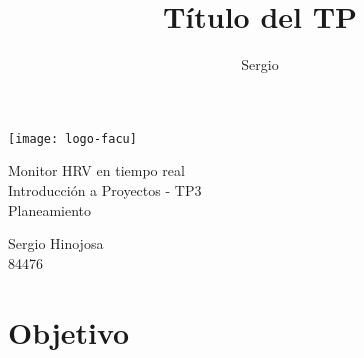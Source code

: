 \documentclass[12pt]{article}
\title{Título del TP}
\author{Sergio}
\numberwithin{equation}{section}
\numberwithin{figure}{section}
\numberwithin{table}{section}
\begin{document}



\begin{titlepage}

\thispagestyle{empty}

\begin{center}
    \texttt{[image: logo-facu]}
\end{center}

\vfill

\begin{center}
	\Huge{Monitor HRV en tiempo real}\\
	\Large{Introducción a Proyectos - TP3}\\
	\Large{Planeamiento}
\end{center}

\vspace{4cm}


\large{
	\begin{tabbing}
		Sergio Hinojosa \hspace{1cm} \\84476 \\
	\end{tabbing}
}

\vfill



\end{titlepage}


\setcounter{page}{1}









% 

\section{Objetivo}
\end{document}
